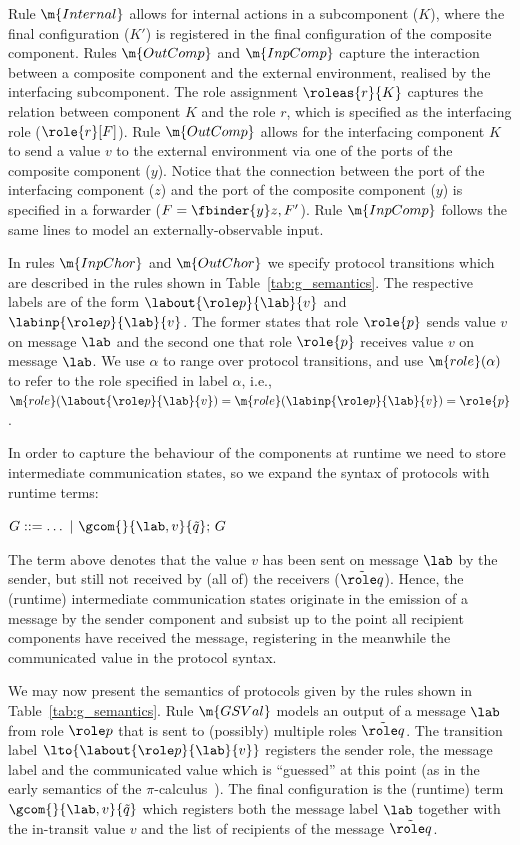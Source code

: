 \begin{itemize}
 Rule $\m{Internal}$ allows for internal actions in a subcomponent ($K$), where the final configuration ($K'$) is registered in the final configuration of the composite component.
%
Rules $\m{OutComp}$ and $\m{InpComp}$ capture the interaction between a composite component and the external environment, realised by the interfacing subcomponent. The role assignment $\roleas{r}{K}$ captures the relation between component $K$ and the role $r$, which is specified as the interfacing role ($\role{r}[ F]$). Rule $\m{OutComp}$ allows for the interfacing component $K$ to send a value $v$ to the external environment via one of the ports of the composite component ($y$). Notice that the connection between the port of the interfacing component ($z$) and the port of the composite component ($y$) is specified in a forwarder ($F = \fbinder {y}z ,  F'$). Rule $\m{InpComp}$ follows the same lines to model an externally-observable input.

In rules $\m{InpChor}$ and $\m{OutChor}$ we specify protocol transitions which are described in the rules shown in Table~\ref{tab:g_semantics}. The respective labels are of the form $\labout{\role p}{\lab}{v}$ and $ \labinp{\role p}{\lab}{v}$. The former states that role $\role{p}$ sends value $v$ on message $\lab$ and the second one that role $\role{p}$
receives value $v$ on message $\lab$. We use $\alpha$ to range over protocol transitions, and use $\m{role}(\alpha)$ to refer to the role specified in label $\alpha$, i.e.,
 $\m{role}(\labout{\role p}{\lab}{v})=\m{role}(\labinp{\role p}{\lab}{v})=\role{p}$. 

In order to capture the behaviour of the components at runtime we need to store intermediate communication states, so we expand the syntax of protocols with runtime terms:

\begin{center}
    $G::=\dots \ | \ \gcom {} {\lab,v}{\tilde  q};\,G $
\end{center}

The term above denotes that the value $v$ has been sent on message $\lab$ by the sender, but still not received by (all of) the receivers ($\tilde{\role q}$). Hence, the (runtime) intermediate communication states originate in the emission of a message by the sender component and subsist up to the point all recipient components have received the message, registering in the meanwhile the communicated value in the protocol syntax.

We may now present the semantics of protocols given by the rules shown in Table~\ref{tab:g_semantics}. Rule $\m{GSVal}$ models an output of a message  $\lab$ from role $\role p$ that is sent to (possibly) multiple roles $\tilde{\role q}$. The transition label $\lto{\labout{\role p}{\lab}{v}}$ registers the sender role, the message label and the communicated value which is ``guessed'' at this point (as in the early semantics of the $\pi$-calculus~\cite{sangiorgowalker}). The final configuration is the (runtime) term $ \gcom {} {\lab,v}{\tilde  q}$ which registers both the message label $\lab$ together with the in-transit value ${v}$ and the list of recipients of the message $\tilde{\role q}$. 


\end{itemize}

